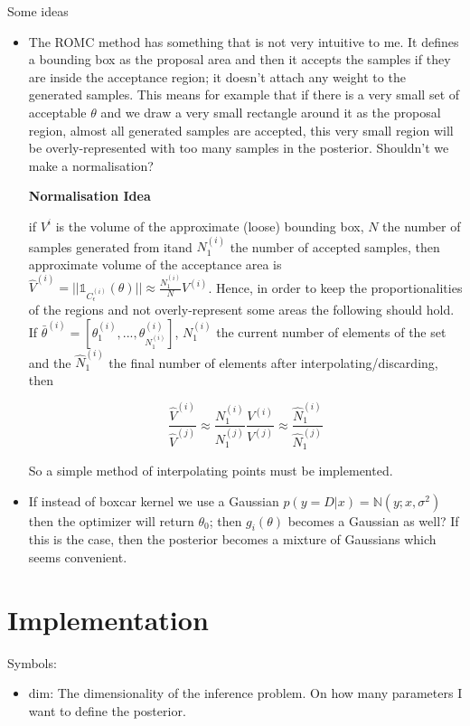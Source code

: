 \documentclass{article}
\begin{document}
  Some ideas

  \begin{itemize}
  \item The ROMC method has something that is not very intuitive to me. It defines a bounding box as the proposal area and then it accepts the samples if they are inside the acceptance region; it doesn't attach any weight to the generated samples. This means for example that if there is a very small set of acceptable $\theta$ and we draw a very small rectangle around it as the proposal region, almost all generated samples are accepted, this very small region will be overly-represented with too many samples in the posterior. Shouldn't we make a normalisation?

    \textbf{Normalisation Idea}

    if $V^{i}$ is the volume of the approximate (loose) bounding box, $N$ the number of samples generated from itand $N_1^{(i)}$ the number of accepted samples, then approximate volume of the acceptance area is $\hat{V}^{(i)} = ||\mathbb{1}_{C_\epsilon^{(i)}}(\theta)|| \approx \frac{N_1^{(i)}}{N}V^{(i)}$. Hence, in order to keep the proportionalities of the regions and not overly-represent some areas the following should hold. If $\bar{\theta}^{(i)}=[\theta^{(i)}_1, ..., \theta^{(i)}_{N_1^{(i)}}]$, $N_1^{(i)}$ the current number of elements of the set and the $\hat{N}_1^{(i)}$ the final number of elements after interpolating/discarding, then

    $$\frac{\hat{V}^{(i)}}{\hat{V}^{(j)}} \approx \frac{N_1^{(i)}}{N_1^{(j)}}\frac{V^{(i)}}{V^{(j)}} \approx \frac{\hat{N}_1^{(i)}}{\hat{N}_1^{(j)}}$$

    So a simple method of interpolating points must be implemented.
    
  \item If instead of boxcar kernel we use a Gaussian $p(y=D|x) = \mathbb{N}(y; x, \sigma^2)$ then the optimizer will return $\theta_0$; then $g_i(\theta)$ becomes a Gaussian as well? If this is the case, then the posterior becomes a mixture of Gaussians which seems convenient.
\end{itemize}

\section{Implementation}

Symbols:
\begin{itemize}
  \item dim: The dimensionality of the inference problem. On how many parameters I want to define the posterior.
  \end{itemize}
\end{document}
